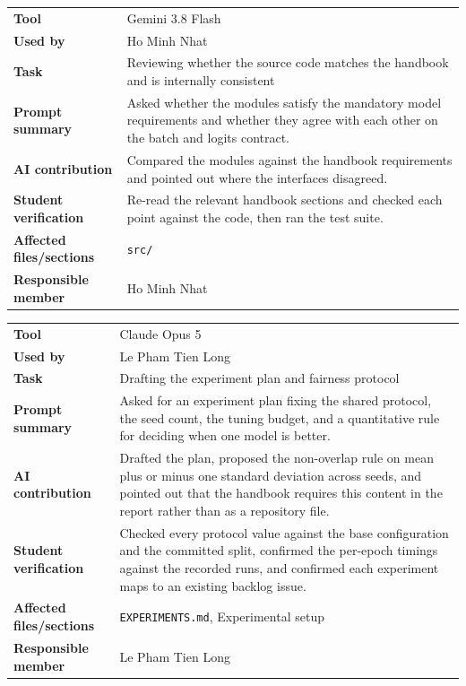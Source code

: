\noindent\begin{minipage}{\textwidth}
\begin{tabularx}{\textwidth}{lX}
\hline
\textbf{Tool} & Gemini 3.8 Flash \\
\textbf{Used by} & Ho Minh Nhat \\
\textbf{Task} & Reviewing whether the source code matches the handbook and is internally consistent \\
\textbf{Prompt summary} & Asked whether the modules satisfy the mandatory model requirements and whether they agree with each other on the batch and logits contract. \\
\textbf{AI contribution} & Compared the modules against the handbook requirements and pointed out where the interfaces disagreed. \\
\textbf{Student verification} & Re-read the relevant handbook sections and checked each point against the code, then ran the test suite. \\
\textbf{Affected files/sections} & \texttt{src/} \\
\textbf{Responsible member} & Ho Minh Nhat \\
\hline
\end{tabularx}
\end{minipage}

\noindent\begin{minipage}{\textwidth}
\begin{tabularx}{\textwidth}{lX}
\hline
\textbf{Tool} & Claude Opus 5 \\
\textbf{Used by} & Le Pham Tien Long \\
\textbf{Task} & Drafting the experiment plan and fairness protocol \\
\textbf{Prompt summary} & Asked for an experiment plan fixing the shared protocol, the seed count, the tuning budget, and a quantitative rule for deciding when one model is better. \\
\textbf{AI contribution} & Drafted the plan, proposed the non-overlap rule on mean plus or minus one standard deviation across seeds, and pointed out that the handbook requires this content in the report rather than as a repository file. \\
\textbf{Student verification} & Checked every protocol value against the base configuration and the committed split, confirmed the per-epoch timings against the recorded runs, and confirmed each experiment maps to an existing backlog issue. \\
\textbf{Affected files/sections} & \texttt{EXPERIMENTS.md}, Experimental setup \\
\textbf{Responsible member} & Le Pham Tien Long \\
\hline
\end{tabularx}
\end{minipage}

